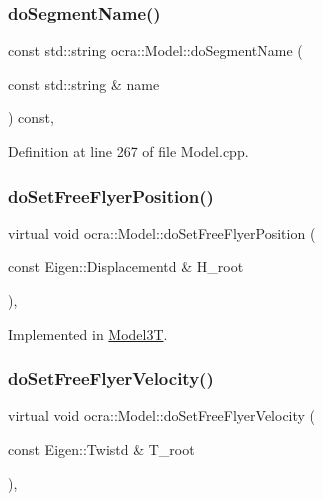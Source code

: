 \subsubsection{\texorpdfstring{do\+Segment\+Name()}{doSegmentName()}}
{\footnotesize\ttfamily const std\+::string ocra\+::\+Model\+::do\+Segment\+Name (\begin{DoxyParamCaption}\item[{const std\+::string \&}]{name }\end{DoxyParamCaption}) const\hspace{0.3cm}{\ttfamily [protected]}, {\ttfamily [virtual]}}



Definition at line 267 of file Model.\+cpp.

\hypertarget{classocra_1_1Model_a4174e9fd30f913f43e516bbef9583ca2}{}\label{classocra_1_1Model_a4174e9fd30f913f43e516bbef9583ca2} 
\subsubsection{\texorpdfstring{do\+Set\+Free\+Flyer\+Position()}{doSetFreeFlyerPosition()}}
{\footnotesize\ttfamily virtual void ocra\+::\+Model\+::do\+Set\+Free\+Flyer\+Position (\begin{DoxyParamCaption}\item[{const Eigen\+::\+Displacementd \&}]{H\+\_\+root }\end{DoxyParamCaption})\hspace{0.3cm}{\ttfamily [protected]}, {}}



Implemented in \hyperlink{classModel3T_ab239abd9e83130d463503eb5915e2ed1}{Model3T}.

\hypertarget{classocra_1_1Model_aad824e82f724f24e3769c74355162bda}{}\label{classocra_1_1Model_aad824e82f724f24e3769c74355162bda} 
\subsubsection{\texorpdfstring{do\+Set\+Free\+Flyer\+Velocity()}{doSetFreeFlyerVelocity()}}
{\footnotesize\ttfamily virtual void ocra\+::\+Model\+::do\+Set\+Free\+Flyer\+Velocity (\begin{DoxyParamCaption}\item[{const Eigen\+::\+Twistd \&}]{T\+\_\+root }\end{DoxyParamCaption})\hspace{0.3cm}{\ttfamily [protected]}, {}}



